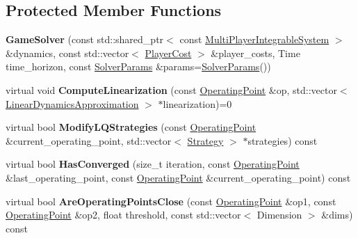 \subsection*{Protected Member Functions}
\begin{DoxyCompactItemize}
\item 
{\bfseries Game\+Solver} (const std\+::shared\+\_\+ptr$<$ const \hyperlink{classilqgames_1_1_multi_player_integrable_system}{Multi\+Player\+Integrable\+System} $>$ \&dynamics, const std\+::vector$<$ \hyperlink{classilqgames_1_1_player_cost}{Player\+Cost} $>$ \&player\+\_\+costs, Time time\+\_\+horizon, const \hyperlink{structilqgames_1_1_solver_params}{Solver\+Params} \&params=\hyperlink{structilqgames_1_1_solver_params}{Solver\+Params}())\hypertarget{classilqgames_1_1_game_solver_a89a591bb5d9fcefc28157a54b016a4d1}{}\label{classilqgames_1_1_game_solver_a89a591bb5d9fcefc28157a54b016a4d1}

\item 
virtual void {\bfseries Compute\+Linearization} (const \hyperlink{structilqgames_1_1_operating_point}{Operating\+Point} \&op, std\+::vector$<$ \hyperlink{structilqgames_1_1_linear_dynamics_approximation}{Linear\+Dynamics\+Approximation} $>$ $\ast$linearization)=0\hypertarget{classilqgames_1_1_game_solver_a4a1772a9bd07347ed28455119b2571fe}{}\label{classilqgames_1_1_game_solver_a4a1772a9bd07347ed28455119b2571fe}

\item 
virtual bool {\bfseries Modify\+L\+Q\+Strategies} (const \hyperlink{structilqgames_1_1_operating_point}{Operating\+Point} \&current\+\_\+operating\+\_\+point, std\+::vector$<$ \hyperlink{structilqgames_1_1_strategy}{Strategy} $>$ $\ast$strategies) const \hypertarget{classilqgames_1_1_game_solver_a02461f67e30de7a1fa44c72160c47fb6}{}\label{classilqgames_1_1_game_solver_a02461f67e30de7a1fa44c72160c47fb6}

\item 
virtual bool {\bfseries Has\+Converged} (size\+\_\+t iteration, const \hyperlink{structilqgames_1_1_operating_point}{Operating\+Point} \&last\+\_\+operating\+\_\+point, const \hyperlink{structilqgames_1_1_operating_point}{Operating\+Point} \&current\+\_\+operating\+\_\+point) const \hypertarget{classilqgames_1_1_game_solver_a41c295d2bd647104daf98e8792d438e9}{}\label{classilqgames_1_1_game_solver_a41c295d2bd647104daf98e8792d438e9}

\item 
virtual bool {\bfseries Are\+Operating\+Points\+Close} (const \hyperlink{structilqgames_1_1_operating_point}{Operating\+Point} \&op1, const \hyperlink{structilqgames_1_1_operating_point}{Operating\+Point} \&op2, float threshold, const std\+::vector$<$ Dimension $>$ \&dims) const \hypertarget{classilqgames_1_1_game_solver_a98a3abcc7548e8c8ba26ec3e703668fa}{}\label{classilqgames_1_1_game_solver_a98a3abcc7548e8c8ba26ec3e703668fa}


\end{DoxyCompactItemize}
